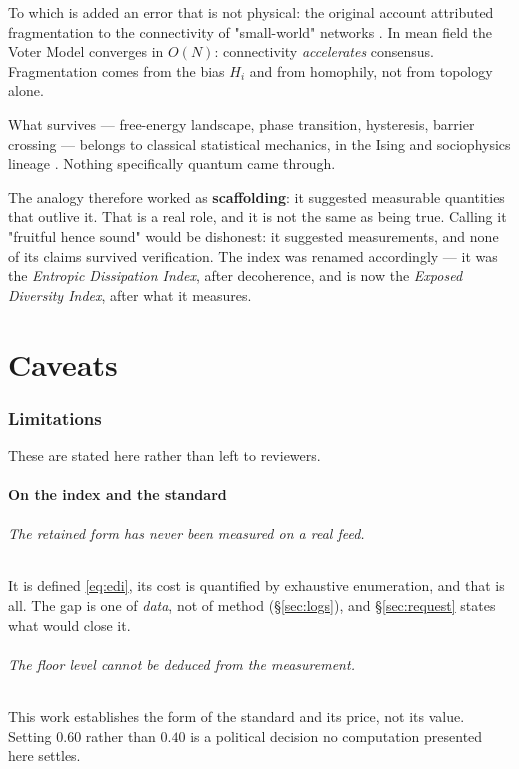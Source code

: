 \documentclass[11pt,a4paper]{article}
\begin{document}
To which is added an error that is not physical: the original account attributed fragmentation
to the connectivity of "small-world" networks \citep{watts1998}. In mean field the Voter Model
converges in $O(N)$: connectivity \emph{accelerates} consensus. Fragmentation comes from the
bias $H_i$ and from homophily, not from topology alone.

What survives --- free-energy landscape, phase transition, hysteresis, barrier crossing ---
belongs to classical statistical mechanics, in the Ising and sociophysics lineage
\citep{galam2004,castellano2009}. Nothing specifically quantum came through.

The analogy therefore worked as \textbf{scaffolding}: it suggested measurable quantities that
outlive it. That is a real role, and it is not the same as being true. Calling it "fruitful
hence sound" would be dishonest: it suggested measurements, and none of its claims survived
verification. The index was renamed accordingly --- it was the \emph{Entropic Dissipation
Index}, after decoherence, and is now the \emph{Exposed Diversity Index}, after what it
measures.

\part{Caveats}

\section{Limitations}
\label{sec:limits}

These are stated here rather than left to reviewers.

\subsection{On the index and the standard}

\paragraph{The retained form has never been measured on a real feed.} It is defined
\eqref{eq:edi}, its cost is quantified by exhaustive enumeration, and that is all. The gap is
one of \emph{data}, not of method (\S\ref{sec:logs}), and \S\ref{sec:request} states what would
close it.

\paragraph{The floor level cannot be deduced from the measurement.} This work establishes the
form of the standard and its price, not its value. Setting $0.60$ rather than $0.40$ is a
political decision no computation presented here settles.
\end{document}
